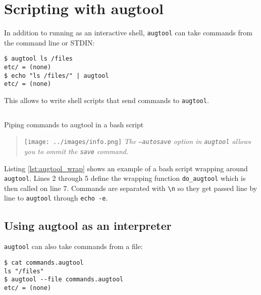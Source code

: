 \section{Scripting with augtool}


In addition to running as an interactive shell, \verb!augtool! can take commands from the command line or STDIN:

 

\begin{verbatim}
$ augtool ls /files
etc/ = (none)
$ echo "ls /files/" | augtool
etc/ = (none)
\end{verbatim}

This allows to write shell scripts that send commands to \verb!augtool!.

  

\begin{listing}[H]
  \inputminted[linenos,frame=leftline]{bash}{listings/augtool_wrap.sh}
  \caption{Piping commands to augtool in a bash script}
  \label{lst:augtool_wrap}
\end{listing}


\begin{quote}
\texttt{[image: ../images/info.png]} \emph{The \texttt{--autosave} option in \texttt{augtool} allows you to ommit the \texttt{save} command.}
\end{quote}

Listing \ref{lst:augtool_wrap} shows an example of a bash script wrapping around \verb!augtool!. Lines 2 through 5 define the wrapping function \verb!do_augtool! which is then called on line 7. Commands are separated with \verb!\n! so they get passed line by line to \verb!augtool! through \verb!echo -e!.


\subsection{Using augtool as an interpreter}

\verb!augtool! can also take commands from a file:

 

\begin{verbatim}
$ cat commands.augtool
ls "/files"
$ augtool --file commands.augtool
etc/ = (none)
\end{verbatim}

